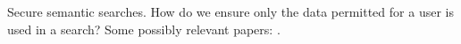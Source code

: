 \textsf{Secure semantic searches.  How do we ensure only the data permitted for a user is used in a search?}
Some possibly relevant papers: \cite{Thura2005,Xia2014}.
